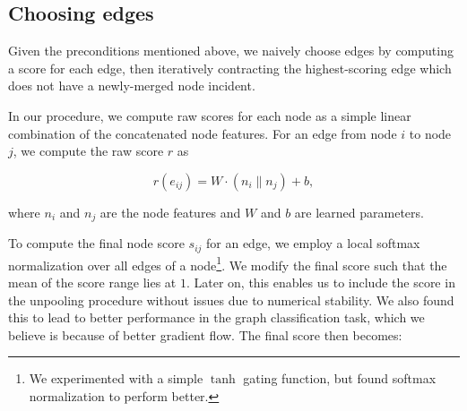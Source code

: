\documentclass{article}
\newcommand{\concatenate}{\|}
\begin{document}
\subsection{Choosing edges}

Given the preconditions mentioned above, we naively choose edges by computing a score for each edge, then iteratively contracting the highest-scoring edge which does not have a newly-merged node incident.

In our procedure, we compute raw scores for each node as a simple linear combination of the concatenated node features. For an edge from node $i$ to node $j$, we compute the raw score $r$ as 

\begin{equation}
	r(e_{ij}) = W \cdot  (n_i \concatenate n_j) + b,
	\label{eq:raw_edge_scores}
\end{equation}

where $n_i$ and $n_j$ are the node features and $W$ and $b$ are learned parameters.

To compute the final node score $s_{ij}$ for an edge, we employ a local softmax normalization over all edges of a node\footnote{We experimented with a simple $\tanh$ gating function, but found softmax normalization to perform better.}. We modify the final score such that the mean of the score range lies at $1$. Later on, this enables us to include the score in the unpooling procedure without issues due to numerical stability. We also found this to lead to better performance in the graph classification task, which we believe is because of better gradient flow. The final score then becomes:
\end{document}
